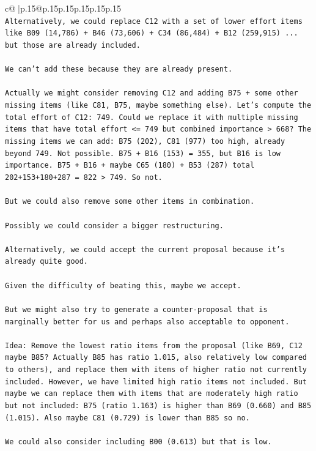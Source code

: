 \documentclass{article}
\begin{document}
{\begin{supertabular}{c@{$\;$}|p{.15\linewidth}@{}p{.15\linewidth}p{.15\linewidth}p{.15\linewidth}p{.15\linewidth}p{.15\linewidth}}
{{{\\ 
\texttt{Alternatively, we could replace C12 with a set of lower effort items like B09 (14,786) + B46 (73,606) + C34 (86,484) + B12 (259,915) ... but those are already included.} \\
\\ 
\texttt{We can't add these because they are already present.} \\
\\ 
\texttt{Actually we might consider removing C12 and adding B75 + some other missing items (like C81, B75, maybe something else). Let's compute the total effort of C12: 749. Could we replace it with multiple missing items that have total effort <= 749 but combined importance > 668? The missing items we can add: B75 (202), C81 (977) too high, already beyond 749. Not possible. B75 + B16 (153) = 355, but B16 is low importance. B75 + B16 + maybe C65 (180) + B53 (287) total 202+153+180+287 = 822 > 749. So not.} \\
\\ 
\texttt{But we could also remove some other items in combination.} \\
\\ 
\texttt{Possibly we could consider a bigger restructuring.} \\
\\ 
\texttt{Alternatively, we could accept the current proposal because it's already quite good.} \\
\\ 
\texttt{Given the difficulty of beating this, maybe we accept.} \\
\\ 
\texttt{But we might also try to generate a counter{-}proposal that is marginally better for us and perhaps also acceptable to opponent.} \\
\\ 
\texttt{Idea: Remove the lowest ratio items from the proposal (like B69, C12 maybe B85? Actually B85 has ratio 1.015, also relatively low compared to others), and replace them with items of higher ratio not currently included. However, we have limited high ratio items not included. But maybe we can replace them with items that are moderately high ratio but not included: B75 (ratio 1.163) is higher than B69 (0.660) and B85 (1.015). Also maybe C81 (0.729) is lower than B85 so no.} \\
\\ 
\texttt{We could also consider including B00 (0.613) but that is low.} \\
\\ 
}}}
\end{supertabular}}
\end{document}
